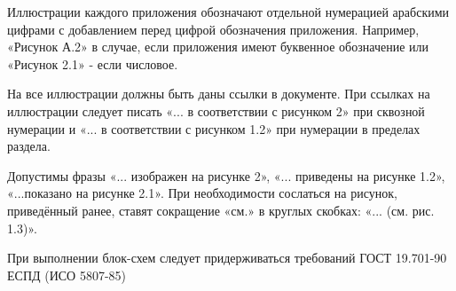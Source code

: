 Иллюстрации каждого приложения обозначают отдельной нумерацией арабскими
цифрами с добавлением перед цифрой обозначения приложения. Например, «Рисунок А.2» в
случае, если приложения имеют буквенное обозначение или «Рисунок 2.1» - если числовое.

На все иллюстрации должны быть даны ссылки в документе. При ссылках на
иллюстрации следует писать «... в соответствии с рисунком 2» при сквозной нумерации и «... в
соответствии с рисунком 1.2» при нумерации в пределах раздела.

Допустимы фразы «... изображен на рисунке 2», «... приведены на рисунке 1.2»,
«...показано на рисунке 2.1». При необходимости сослаться на рисунок, приведённый ранее,
ставят сокращение «см.» в круглых скобках: «... (см. рис. 1.3)».

При выполнении блок-схем следует придерживаться требований ГОСТ 19.701-90 ЕСПД
(ИСО 5807-85)

